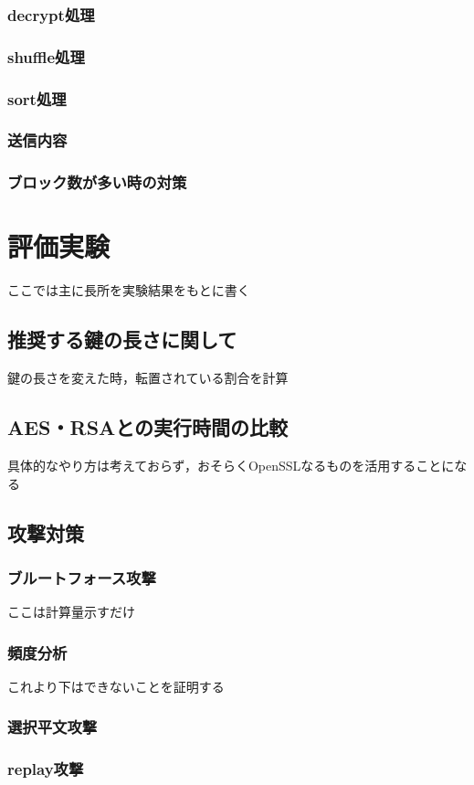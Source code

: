 \subsubsection{decrypt処理}
\subsubsection{shuffle処理}
\subsubsection{sort処理}
\subsubsection{送信内容}
\subsubsection{ブロック数が多い時の対策}

\section{評価実験}
ここでは主に長所を実験結果をもとに書く
\subsection{推奨する鍵の長さに関して}
鍵の長さを変えた時，転置されている割合を計算
\subsection{AES・RSAとの実行時間の比較}
具体的なやり方は考えておらず，おそらくOpenSSLなるものを活用することになる
\subsection{攻撃対策}
\subsubsection{ブルートフォース攻撃}
ここは計算量示すだけ
\subsubsection{頻度分析}
これより下はできないことを証明する
\subsubsection{選択平文攻撃}
\subsubsection{replay攻撃}
